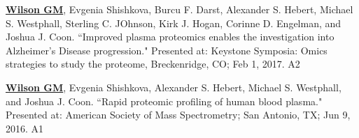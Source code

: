 
\begin{cvpubs}

  \cvpub
    {\underline{\textbf{Wilson GM}}, Evgenia Shishkova, Burcu F. Darst, Alexander S. Hebert, Michael S. Westphall, Sterling C. JOhnson, Kirk J. Hogan, Corinne D. Engelman, and Joshua J. Coon. ``Improved plasma proteomics enables the investigation into Alzheimer's Disease progression." Presented at: Keystone Symposia: Omics strategies to study the proteome, Breckenridge, CO; Feb 1, 2017.} %
    {A2} %

  \cvpub
    {\underline{\textbf{Wilson GM}}, Evgenia Shishkova, Alexander S. Hebert, Michael S. Westphall, and Joshua J. Coon. ``Rapid proteomic profiling of human blood plasma." Presented at: American Society of Mass Spectrometry; San Antonio, TX; Jun 9, 2016.} %
    {A1} %

\end{cvpubs}